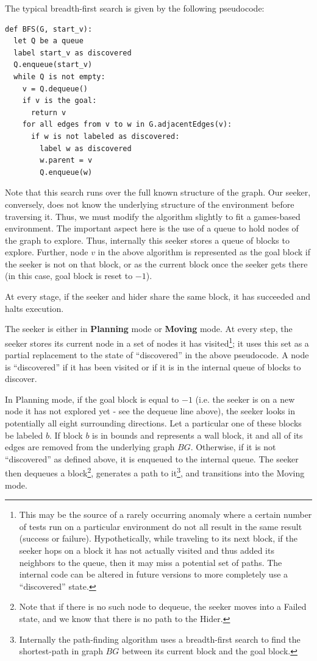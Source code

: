 \documentclass[12pt]{article}
\begin{document}
The typical breadth-first search is given by the following pseudocode:

\begin{lstlisting}
def BFS(G, start_v):
  let Q be a queue
  label start_v as discovered
  Q.enqueue(start_v)
  while Q is not empty:
    v = Q.dequeue()
    if v is the goal:
      return v
    for all edges from v to w in G.adjacentEdges(v):
      if w is not labeled as discovered:
        label w as discovered
        w.parent = v
        Q.enqueue(w)
\end{lstlisting}

Note that this search runs over the full known structure of the graph. Our seeker, conversely, does not know the underlying structure of the environment before traversing it. Thus, we must modify the algorithm slightly to fit a games-based environment. The important aspect here is the use of a queue to hold nodes of the graph to explore. Thus, internally this seeker stores a queue of blocks to explore. Further, node $ v $ in the above algorithm is represented as the goal block if the seeker is not on that block, or as the current block once the seeker gets there (in this case, goal block is reset to $ -1 $). 

At every stage, if the seeker and hider share the same block, it has succeeded and halts execution.

The seeker is either in \textbf{Planning} mode or \textbf{Moving} mode. At every step, the seeker stores its current node in a set of nodes it has visited\footnote{This may be the source of a rarely occurring anomaly where a certain number of tests run on a particular environment do not all result in the same result (success or failure). Hypothetically, while traveling to its next block, if the seeker hops on a block it has not actually visited and thus added its neighbors to the queue, then it may miss a potential set of paths. The internal code can be altered in future versions to more completely use a ``discovered'' state.}; it uses this set as a partial replacement to the state of ``discovered'' in the above pseudocode. A node is ``discovered'' if it has been visited or if it is in the internal queue of blocks to discover.

In Planning mode, if the goal block is equal to $ - 1 $ (i.e. the seeker is on a new node it has not explored yet - see the dequeue line above), the seeker looks in potentially all eight surrounding directions. Let a particular one of these blocks be labeled $ b $. If block $ b $ is in bounds and represents a wall block, it and all of its edges are removed from the underlying graph $ BG $. Otherwise, if it is not ``discovered'' as defined above, it is enqueued to the internal queue. The seeker then dequeues a block\footnote{Note that if there is no such node to dequeue, the seeker moves into a Failed state, and we know that there is no path to the Hider.}, generates a path to it\footnote{Internally the path-finding algorithm uses a breadth-first search to find the shortest-path in graph $ BG $ between its current block and the goal block.}, and transitions into the Moving mode.
\end{document}
